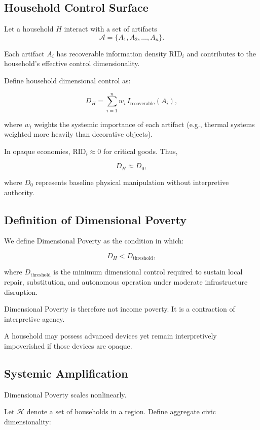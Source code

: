 \documentclass[11pt]{article}
\begin{document}
\subsection{Household Control Surface}

Let a household $H$ interact with a set of artifacts
\[
\mathcal{A} = \{A_1, A_2, \dots, A_n\}.
\]

Each artifact $A_i$ has recoverable information density $\text{RID}_i$
and contributes to the household’s effective control dimensionality.

Define household dimensional control as:

\[
D_H = \sum_{i=1}^{n} w_i \, I_{\text{recoverable}}(A_i),
\]

where $w_i$ weights the systemic importance of each artifact
(e.g., thermal systems weighted more heavily than decorative objects).

In opaque economies, $\text{RID}_i \approx 0$ for critical goods.
Thus,

\[
D_H \approx D_0,
\]

where $D_0$ represents baseline physical manipulation without
interpretive authority.

\subsection{Definition of Dimensional Poverty}

We define Dimensional Poverty as the condition in which:

\[
D_H < D_{\text{threshold}},
\]

where $D_{\text{threshold}}$ is the minimum dimensional control required
to sustain local repair, substitution, and autonomous operation under
moderate infrastructure disruption.

Dimensional Poverty is therefore not income poverty.
It is a contraction of interpretive agency.

A household may possess advanced devices yet remain
interpretively impoverished if those devices are opaque.

\subsection{Systemic Amplification}

Dimensional Poverty scales nonlinearly.

Let $\mathcal{H}$ denote a set of households in a region.
Define aggregate civic dimensionality:
\end{document}
